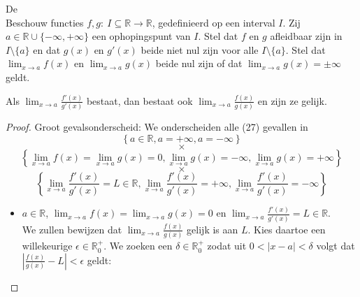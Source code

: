 \documentclass[main.tex]{subfiles}
\begin{document}
\begin{st}
  De \\
  Beschouw functies $f,g:\ I \subseteq \mathbb{R} \rightarrow \mathbb{R}$, gedefinieerd op een interval $I$.
  Zij $a\in \mathbb{R} \cup \{-\infty,+\infty\}$ een ophopingspunt van $I$.
  Stel dat $f$ en $g$ afleidbaar zijn in $I \setminus \{a\}$ en dat $g(x)$ en $g'(x)$ beide niet nul zijn voor alle $I \setminus \{a\}$.
  Stel dat $\lim_{x\rightarrow a}f(x)$ en $\lim_{x\rightarrow a}g(x)$ beide nul zijn of dat $\lim_{x\rightarrow a}g(x) = \pm\infty$ geldt.
  \begin{center}
    Als $\lim_{x\rightarrow a}\frac{f'(x)}{g'(x)}$ bestaat, dan bestaat ook $\lim_{x\rightarrow a}\frac{f(x)}{g(x)}$ en zijn ze gelijk.
  \end{center}

  \begin{proof}
    Groot gevalsonderscheid:
    We onderscheiden alle (27) gevallen in
    \[
    \left\{ a \in \mathbb{R}, a = +\infty, a = -\infty \right\}
    \]\[\times\]\[
    \left\{ \lim_{x\rightarrow a}f(x) = \lim_{x\rightarrow a}g(x) = 0, \lim_{x\rightarrow a}g(x) =-\infty ,\lim_{x\rightarrow a}g(x) =+\infty  \right\}
    \]\[\times\]\[
    \left\{ \lim_{x\rightarrow a}\frac{f'(x)}{g'(x)} = L \in \mathbb{R}, \lim_{x\rightarrow a}\frac{f'(x)}{g'(x)} = +\infty, \lim_{x\rightarrow a}\frac{f'(x)}{g'(x)} = -\infty \right\}
    \]

    \begin{itemize}
    \item $a\in \mathbb{R}$, $\lim_{x\rightarrow a}f(x) = \lim_{x\rightarrow a}g(x) = 0$ en $\lim_{x\rightarrow a}\frac{f'(x)}{g'(x)} = L \in \mathbb{R}$.\\
      We zullen bewijzen dat $\lim_{x\rightarrow a}\frac{f(x)}{g(x)}$ gelijk is aan $L$.
      Kies daartoe een willekeurige $\epsilon \in \mathbb{R}_{0}^{+}$.
      We zoeken een $\delta\in \mathbb{R}_{0}^{+}$ zodat uit $0<|x-a|< \delta$ volgt dat $|\frac{f(x)}{g(x)}-L|<\epsilon$ geldt:


\end{itemize}
\end{proof}
\end{st}
\end{document}
